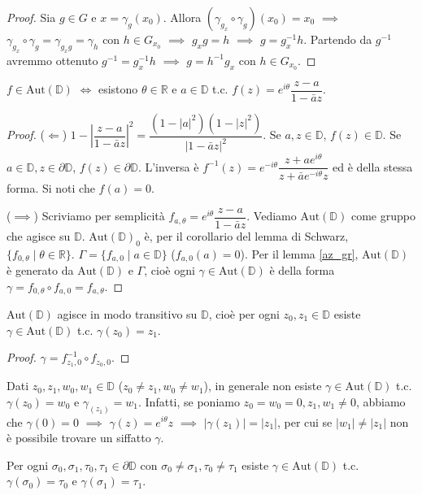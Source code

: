 \begin{proof}
  Sia $g \in G$ e $x=\gamma_g(x_0)$. Allora $(\gamma_{g_x}\circ \gamma_g)(x_0)=x_0$ $\implies$ $\gamma_{g_x}\circ \gamma_g=\gamma_{g_xg}=\gamma_h$ con $h \in G_{x_0}$ $\implies$ $g_xg=h$ $\implies$ $g=g_x^{-1}h$.
  Partendo da $g^{-1}$ avremmo ottenuto $g^{-1}=g_x^{-1}h$ $\implies$ $g=h^{-1}g_x$ con $h \in G_{x_0}$.
\end{proof}

\begin{prop}
  $f \in \text{Aut}(\mathbb{D})$ $\iff$ esistono $\theta \in \mathbb{R}$ e $a \in \mathbb{D}$ t.c. $f(z)=e^{i\theta}\dfrac{z-a}{1-\bar{a}z}$.
\end{prop}

\begin{proof}
  ($\Leftarrow$) $1-\left|\dfrac{z-a}{1-\bar{a}z}\right|^2=\dfrac{(1-|a|^2)(1-|z|^2)}{|1-\bar{a}z|^2}$. Se $a, z \in \mathbb{D}$, $f(z) \in \mathbb{D}$.
  Se $a \in \mathbb{D}, z \in \partial\mathbb{D}$, $f(z) \in \partial\mathbb{D}$. L'inversa è $f^{-1}(z)=e^{-i\theta}\dfrac{z+ae^{i\theta}}{z+\bar{a}e^{-i\theta}z}$ ed è della stessa forma. Si noti che $f(a)=0$.

  ($\implies$) Scriviamo per semplicità $f_{a, \theta}=e^{i\theta}\dfrac{z-a}{1-\bar{a}z}$. Vediamo $\text{Aut}(\mathbb{D})$ come gruppo che agisce su $\mathbb{D}$. $\text{Aut}(\mathbb{D})_0$ è, per il corollario del lemma di Schwarz, $\{f_{0, \theta} \mid \theta \in \mathbb{R}\}$.
  $\Gamma=\{f_{a, 0} \mid a \in \mathbb{D}\}$ ($f_{a, 0}(a)=0$).
  Per il lemma \ref{az_gr}, $\text{Aut}(\mathbb{D})$ è generato da $\text{Aut}(\mathbb{D})$ e $\Gamma$, cioè ogni $\gamma \in \text{Aut}(\mathbb{D})$ è della forma $\gamma=f_{0, \theta} \circ f_{a, 0}=f_{a, \theta}$.
\end{proof}

\begin{cor}
  $\text{Aut}(\mathbb{D})$ agisce in modo transitivo su $\mathbb{D}$, cioè per ogni $z_0, z_1 \in \mathbb{D}$ esiste $\gamma \in \text{Aut}(\mathbb{D})$ t.c. $\gamma(z_0)=z_1$.
\end{cor}

\begin{proof}
  $\gamma=f_{z_1, 0}^{-1} \circ f_{z_0, 0}$.
\end{proof}

\begin{oss}
  Dati $z_0, z_1, w_0, w_1 \in \mathbb{D}$ ($z_0 \not=z_1, w_0 \not=w_1$), in generale non esiste $\gamma \in \text{Aut}(\mathbb{D})$ t.c. $\gamma(z_0)=w_0$ e $\gamma_(z_1)=w_1$.
  Infatti, se poniamo $z_0=w_0=0, z_1, w_1 \not=0$, abbiamo che $\gamma(0)=0$ $\implies$ $\gamma(z)=e^{i\theta}z$ $\implies$ $|\gamma(z_1)|=|z_1|$, per cui se $|w_1|\not=|z_1|$ non è possibile trovare un siffatto $\gamma$.
\end{oss}

\begin{exc}
  Per ogni $\sigma_0, \sigma_1, \tau_0, \tau_1 \in \partial\mathbb{D}$ con $\sigma_0\not=\sigma_1, \tau_0\not=\tau_1$ esiste $\gamma \in \text{Aut}(\mathbb{D})$ t.c. $\gamma(\sigma_0)=\tau_0$ e $\gamma(\sigma_1)=\tau_1$.
\end{exc}
